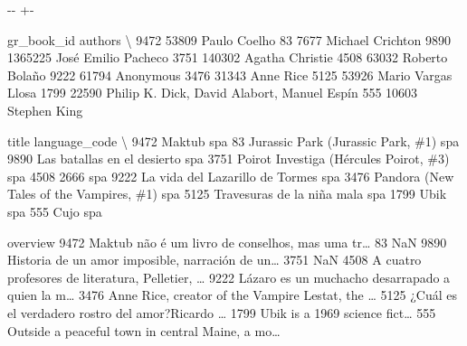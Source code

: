 \documentclass[letterpaper,10pt,english]{sphinxmanual}
\newlength\nbsphinxcodecellspacing
\begin{document}
{

\kern-\sphinxverbatimsmallskipamount\kern-\baselineskip
\kern+\FrameHeightAdjust\kern-\fboxrule
\vspace{\nbsphinxcodecellspacing}

\begin{sphinxVerbatim}[commandchars=\\\{\}]
\llap{\color{nbsphinxout}[18]:\,\hspace{\fboxrule}\hspace{\fboxsep}}      gr\_book\_id                                      authors  \textbackslash{}
9472       53809                                 Paulo Coelho
83          7677                             Michael Crichton
9890     1365225                          José Emilio Pacheco
3751      140302                              Agatha Christie
4508       63032                               Roberto Bolaño
9222       61794                                    Anonymous
3476       31343                                    Anne Rice
5125       53926                           Mario Vargas Llosa
1799       22590  Philip K. Dick, David Alabort, Manuel Espín
555        10603                                 Stephen King

                                        title language\_code  \textbackslash{}
9472                                   Maktub           spa
83          Jurassic Park (Jurassic Park, \#1)           spa
9890              Las batallas en el desierto           spa
3751   Poirot Investiga (Hércules Poirot, \#3)           spa
4508                                     2666           spa
9222          La vida del Lazarillo de Tormes           spa
3476  Pandora (New Tales of the Vampires, \#1)           spa
5125               Travesuras de la niña mala           spa
1799                                     Ubik           spa
555                                      Cujo           spa

                                               overview
9472  Maktub não é um livro de conselhos, mas uma tr{\ldots}
83                                                  NaN
9890  Historia de un amor imposible, narración de un{\ldots}
3751                                                NaN
4508  A cuatro profesores de literatura, Pelletier, {\ldots}
9222  Lázaro es un muchacho desarrapado a quien la m{\ldots}
3476  Anne Rice, creator of the Vampire Lestat, the {\ldots}
5125  ¿Cuál es el verdadero rostro del amor?Ricardo {\ldots}
1799  Ubik is a 1969 science fict{\ldots}
555   Outside a peaceful town in central Maine, a mo{\ldots}
\end{sphinxVerbatim}
}
\end{document}
